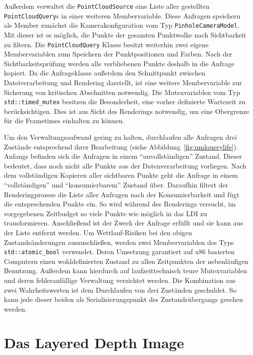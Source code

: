 \documentclass[hyperref, beleg, german]{cgvpub}
\begin{document}
Außerdem verwaltet die \texttt{PointCloudSource} eine Liste aller gestellten
\texttt{PointCloudQuery}s in einer weiteren Membervariable. Diese Anfragen
speichern als Member zunächst die Kamerakonfiguration vom Typ
\texttt{PinholeCameraModel}. Mit dieser ist es möglich, die Punkte der gesamten
Punktwolke nach Sichtbarkeit zu filtern. Die \texttt{PointCloudQuery} Klasse
besitzt weiterhin zwei eigene Membervariablen zum Speichern der Punktpositionen
und Farben. Nach der Sichtbarkeitsprüfung werden alle verbliebenen Punkte
deshalb in die Anfrage kopiert. Da die Anfrageklasse außerdem den Schnittpunkt
zwischen Dateiverarbeitung und Rendering darstellt, ist eine weitere
Membervariable zur Sicherung von kritischen Abschnitten notwendig. Die
Mutexvariablen vom Typ \texttt{std::timed\_mutex} besitzen die Besonderheit,
eine vorher definierte Wartezeit zu berücksichtigen. Dies ist aus Sicht des
Renderings notwendig, um eine Obergrenze für die Frametimes einhalten zu
können.

Um den Verwaltungsaufwand gering zu halten, durchlaufen alle Anfragen drei
Zustände entsprechend ihrer Bearbeitung (siehe
Abbildung~\ref{fig:umlquerylife}). Anfangs befinden sich die Anfragen in einem
``unvollständigen'' Zustand. Dieser bedeutet, dass noch nicht alle Punkte aus
der Datenverarbeitung vorliegen. Nach dem vollständigen Kopieren aller
sichtbaren Punkte geht die Anfrage in einem ``vollständigen'' und
``konsumierbarem'' Zustand über. Daraufhin filtert der Renderingprozess die
Liste aller Anfragen nach der Konsumierbarkeit und fügt die entsprechenden
Punkte ein. So wird während des Renderings versucht, im vorgegebenen Zeitbudget
so viele Punkte wie möglich in das LDI zu transformieren. Anschließend ist der
Zweck der Anfrage erfüllt und sie kann aus der Liste entfernt werden. Um
Wettlauf-Risiken bei den obigen Zustandsänderungen auszuschließen, werden zwei
Membervariablen des Typs \texttt{std::atomic\_bool} verwendet. Deren Umsetzung
garantiert auf x86 basierten Computern einen wohldefinierten Zustand zu allen
Zeitpunkten der nebenläufigen Benutzung. Außerdem kann hierdurch auf
laufzeittechnisch teure Mutexvariablen und deren fehleranfällige Verwaltung
verzichtet werden. Die Kombination aus zwei Wahrheitswerten ist dem Durchlaufen
von drei Zuständen geschuldet. So kann jede dieser beiden als
Serialisierungspunkt des Zustandsübergangs gesehen werden.

\section{Das Layered Depth Image}
\end{document}
